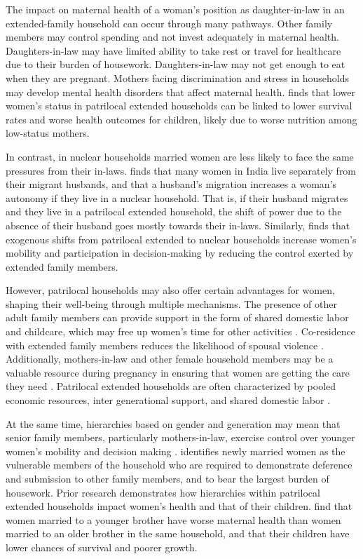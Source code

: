 \documentclass[12pt]{article}
\begin{document}
The impact on maternal health of a woman's position as daughter-in-law in an extended-family household can occur through many pathways. Other family members may control spending and not invest adequately in maternal health. Daughters-in-law may have limited ability to take rest or travel for healthcare due to their burden of housework. Daughters-in-law may not get enough to eat when they are pregnant. Mothers facing discrimination and stress in households may develop mental health disorders that affect maternal health. \cite{coffey2022mothers} finds that lower women’s status in patrilocal extended households can be linked to lower survival rates and worse health outcomes for children, likely due to worse nutrition among low-status mothers.

In contrast, in nuclear households married women are less likely to face the same pressures from their in-laws. \cite{desai2008negotiated} finds that many women in India live separately from their migrant husbands, and that a husband's migration increases a woman's autonomy if they live in a nuclear household. That is, if their husband migrates and they live in a patrilocal extended household, the shift of power due to the absence of their husband goes mostly towards their in-laws. Similarly, \cite{mookerjee2019gender} finds that exogenous shifts from patrilocal extended to nuclear households increase women’s mobility and participation in decision-making by reducing the control exerted by extended family members.

However, patrilocal households may also offer certain advantages for women, shaping their well-being through multiple mechanisms.  The presence of other adult family members can provide support in the form of shared domestic labor and childcare, which may free up women’s time for other activities \cite{khanna2024role}. Co-residence with extended family members reduces the likelihood of spousal violence \cite{khanna2024role}. Additionally, mothers-in-law and other female household members may be a valuable resource during pregnancy in ensuring that women are getting the care they need \cite{varghese2019coresidence}.  Patrilocal extended households are often characterized by pooled economic resources, inter generational support, and shared domestic labor \citep{wadley1988karimpur}.  

At the same time, hierarchies based on gender and generation may mean that senior family members, particularly mothers-in-law, exercise control over younger women’s mobility and decision making \citep{desai2005women, bloom2001dimensions}. \cite{gupta1999lifeboat} identifies newly married women as the  vulnerable members of the household who are required to demonstrate deference and submission to other family members, and to bear the largest burden of housework. Prior research demonstrates how hierarchies within patrilocal extended households impact women’s health and that of their children. \cite{coffey2022mothers} find that women married to a younger brother have worse maternal health than women married to an older brother in the same household, and that their children have lower chances of survival and poorer growth.
\end{document}
